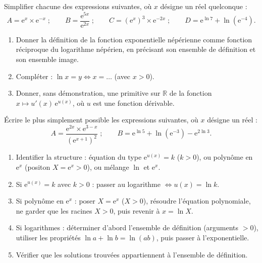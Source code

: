 \documentclass[11pt]{article}
\newcounter{popsec}
\newcounter{popsub}
\newcommand{\courssub}[1]{%
  \stepcounter{popsub}%
  \par\vspace{9pt}\noindent{\popxbold\fontsize{11.5}{13}\selectfont\color{popink}{\color{poporange}\thepopsec.\thepopsub}\hspace{6pt}#1}\par\nopagebreak\vspace{4pt}
}
\begin{document}
\begin{exercice}
Simplifier chacune des expressions suivantes, où $x$ désigne un réel quelconque :
\[ A = \mathrm{e}^{x}\times \mathrm{e}^{-x} \;;\qquad B = \dfrac{\mathrm{e}^{5x}}{\mathrm{e}^{2x}} \;;\qquad C = \left(\mathrm{e}^{x}\right)^{3}\times \mathrm{e}^{-2x} \;;\qquad D = \mathrm{e}^{\ln 7} + \ln\left(\mathrm{e}^{-4}\right). \]
\end{exercice}

\begin{exercice}
\begin{enumerate}
\item Donner la définition de la fonction exponentielle népérienne comme fonction réciproque du logarithme népérien, en précisant son ensemble de définition et son ensemble image.
\item Compléter : $\ln x = y \iff x = \ldots$ (avec $x > 0$).
\item Donner, sans démonstration, une primitive sur $\mathbb{R}$ de la fonction $x \longmapsto u'(x)\,\mathrm{e}^{u(x)}$, où $u$ est une fonction dérivable.
\end{enumerate}
\end{exercice}

\courssub{Je m'entraîne}

\begin{exercice}
Écrire le plus simplement possible les expressions suivantes, où $x$ désigne un réel :
\[ A = \dfrac{\mathrm{e}^{2x}\times \mathrm{e}^{3-x}}{\left(\mathrm{e}^{x+1}\right)^{2}} \;;\qquad B = \mathrm{e}^{\ln 5} + \ln\left(\mathrm{e}^{-3}\right) - \mathrm{e}^{2\ln 3}. \]
\end{exercice}

\begin{methode}
\begin{enumerate}
\item Identifier la structure : équation du type $\mathrm{e}^{u(x)} = k$ ($k>0$), ou polynôme en $\mathrm{e}^x$ (positon $X=\mathrm{e}^x>0$), ou mélange $\ln$ et $\mathrm{e}^x$.
\item Si $\mathrm{e}^{u(x)} = k$ avec $k>0$ : passer au logarithme $\iff u(x) = \ln k$.
\item Si polynôme en $\mathrm{e}^x$ : poser $X = \mathrm{e}^x$ ($X>0$), résoudre l'équation polynomiale, ne garder que les racines $X>0$, puis revenir à $x = \ln X$.
\item Si logarithmes : déterminer d'abord l'ensemble de définition (arguments $>0$), utiliser les propriétés $\ln a + \ln b = \ln(ab)$, puis passer à l'exponentielle.
\item Vérifier que les solutions trouvées appartiennent à l'ensemble de définition.
\end{enumerate}
\end{methode}
\end{document}
